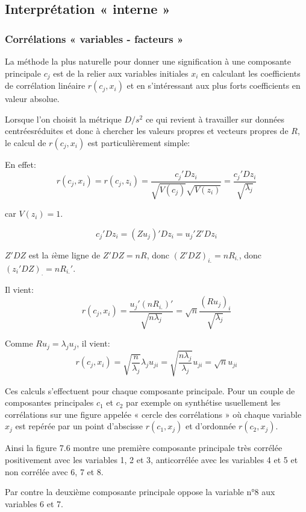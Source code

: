 \documentclass[12pt,a4paper]{article}
\begin{document}
\subsection{Interprétation « interne »}

\subsubsection{Corrélations « variables - facteurs »}

La méthode la plus naturelle pour donner une signification à une composante principale
$c_j$ est de la relier aux variables initiales $x_i$ en calculant les coefficients de corrélation linéaire $r(c_j, x_i)$ et en s'intéressant aux plus forts coefficients en valeur absolue.

Lorsque l'on choisit la métrique $D/s^2$ ce qui revient à travailler sur données centréesréduites et donc à chercher les valeurs propres et vecteurs propres de $R$, le calcul de $r(c_j, x_i)$
est particulièrement simple:

En effet:
\[r(c_j, x_i) = r(c_j, z_i) = \frac{c_j' D z_i}{\sqrt{V(c_j)} \sqrt{V(z_i)}} = \frac{c_j' D z_i}{\sqrt{\lambda_j}}\]

car $V(z_i) = 1$.

\[c_j' D z_i = (Z u_j)' D z_i = u_j' Z' D z_i\]

$Z' D Z$ est la $i$ème ligne de $Z' D Z = n R$, donc $(Z' D Z)_{i.} = n R_{i.}$, donc $(z_i' D Z)_{.} = n R_{i.}'$.

Il vient:
\[r(c_j, x_i) = \frac{u_j' (n R_{i.})'}{\sqrt{n \lambda_j}} = \sqrt{n} \frac{(R u_j)_i}{\sqrt{\lambda_j}}\]

Comme $R u_j = \lambda_j u_j$, il vient:
\[r(c_j, x_i) = \sqrt{\frac{n}{\lambda_j}} \lambda_j u_{ji} = \sqrt{\frac{n \lambda_j}{\lambda_j}} u_{ji} = \sqrt{n} u_{ji}\]

Ces calculs s'effectuent pour chaque composante principale. Pour un couple de composantes principales $c_1$ et $c_2$ par exemple on synthétise usuellement les corrélations sur une
figure appelée « cercle des corrélations » où chaque variable $x_j$ est repérée par un point
d'abscisse $r(c_1, x_j)$ et d'ordonnée $r(c_2, x_j)$.

Ainsi la figure 7.6 montre une première composante principale très corrélée positivement avec les variables 1, 2 et 3, anticorrélée avec les variables 4 et 5 et non corrélée avec
6, 7 et 8.

Par contre la deuxième composante principale oppose la variable n°8 aux variables 6 et 7.
\end{document}
